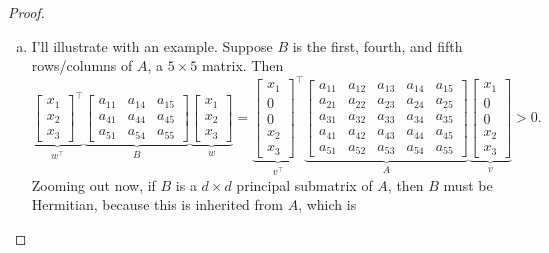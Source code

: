 \documentclass{article}
\begin{document}
\begin{proof} ~ %
  \begin{enumerate}[(a)]
    \item
    I'll illustrate with an example. Suppose $B$ is the first, fourth, and fifth
    rows/columns of $A$, a $5 \times 5$ matrix. Then \[
      \underbrace{
        \begin{bmatrix} x_1 \\ x_2 \\ x_3 \end{bmatrix}^\top
      }_{w^\top}
      \underbrace{
        \begin{bmatrix}
          a_{11} & a_{14} & a_{15} \\
          a_{41} & a_{44} & a_{45} \\
          a_{51} & a_{54} & a_{55}
        \end{bmatrix}
      }_B
      \underbrace{
        \begin{bmatrix} x_1 \\ x_2 \\ x_3 \end{bmatrix}
      }_{w} =
      \underbrace{
        \begin{bmatrix} x_1 \\ 0 \\ 0 \\ x_2 \\ x_3 \end{bmatrix}^\top
      }_{v^\top}
      \underbrace{
        \begin{bmatrix}
          a_{11} & a_{12} & a_{13} & a_{14} & a_{15} \\
          a_{21} & a_{22} & a_{23} & a_{24} & a_{25} \\
          a_{31} & a_{32} & a_{33} & a_{34} & a_{35} \\
          a_{41} & a_{42} & a_{43} & a_{44} & a_{45} \\
          a_{51} & a_{52} & a_{53} & a_{54} & a_{55}
        \end{bmatrix}
      }_A
      \underbrace{
        \begin{bmatrix} x_1 \\ 0 \\ 0 \\ x_2 \\ x_3 \end{bmatrix}
      }_{v} > 0.
    \] Zooming out now, if $B$ is a $d \times d$ principal submatrix of $A$,
    then $B$ must be Hermitian, because this is inherited from $A$, which is

\end{enumerate}
\end{proof}
\end{document}
